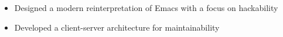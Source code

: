 \begin{itemize}
  \item Designed a modern reinterpretation of Emacs with a focus on hackability
  \item Developed a client-server architecture for maintainability
\end{itemize}
\vspace{4pt}
